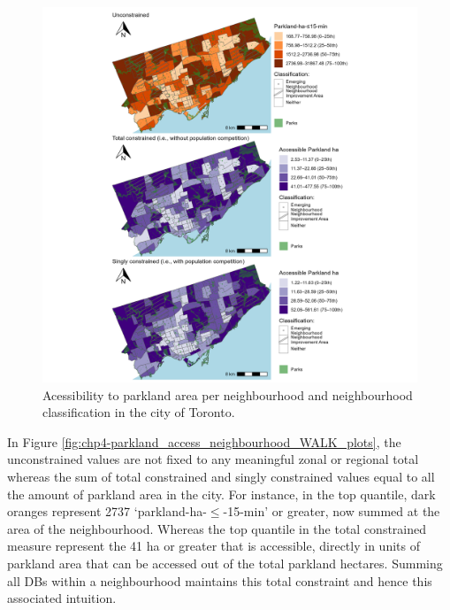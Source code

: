 \documentclass[
11pt, %
oneside, %
english, %
singlespacing, %
]{macthesis} %
\begin{document}
\begin{figure}

{\centering \includegraphics[width=6in]{./data/figures/chp4-parkland_access_neighbourhood_WALK_plots} 

}

\caption{\label{fig:chp4-parkland_access_neighbourhood_WALK_plots}Acessibility to parkland area per neighbourhood and neighbourhood classification in the city of Toronto.}\label{fig:unnamed-chunk-58}
\end{figure}

In Figure \ref{fig:chp4-parkland_access_neighbourhood_WALK_plots}, the unconstrained values are not fixed to any meaningful zonal or regional total whereas the sum of total constrained and singly constrained values equal to all the amount of parkland area in the city. For instance, in the top quantile, dark oranges represent 2737 `parkland-ha-\(\le\)-15-min' or greater, now summed at the area of the neighbourhood. Whereas the top quantile in the total constrained measure represent the 41 ha or greater that is accessible, directly in units of parkland area that can be accessed out of the total parkland hectares. Summing all DBs within a neighbourhood maintains this total constraint and hence this associated intuition.
\end{document}
